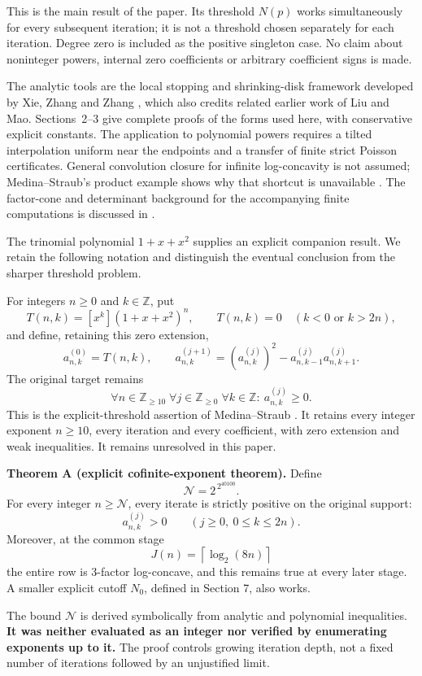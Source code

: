 \documentclass[11pt,a4paper]{article}
\begin{document}
This is the main result of the paper. Its threshold \(N(p)\) works simultaneously for every subsequent iteration; it is not a threshold chosen separately for each iteration. Degree zero is included as the positive singleton case. No claim about noninteger powers, internal zero coefficients or arbitrary coefficient signs is made.

The analytic tools are the local stopping and shrinking-disk framework developed by Xie, Zhang and Zhang \cite[Section~2]{XZZ}, which also credits related earlier work of Liu and Mao. Sections~2--3 give complete proofs of the forms used here, with conservative explicit constants. The application to polynomial powers requires a tilted interpolation uniform near the endpoints and a transfer of finite strict Poisson certificates. General convolution closure for infinite log-concavity is not assumed; Medina--Straub's product example shows why that shortcut is unavailable \cite[Example~5.1]{MS}. The factor-cone and determinant background for the accompanying finite computations is discussed in \cite{MCS}.

The trinomial polynomial \(1+x+x^2\) supplies an explicit companion result. We retain the following notation and distinguish the eventual conclusion from the sharper threshold problem.

For integers \(n\geq0\) and \(k\in\mathbb Z\), put \[
 T(n,k)=[x^k](1+x+x^2)^n,
 \qquad T(n,k)=0\quad(k<0\text{ or }k>2n),
\] and define, retaining this zero extension, \[
 a^{(0)}_{n,k}=T(n,k),\qquad
 a^{(j+1)}_{n,k}=(a^{(j)}_{n,k})^2-a^{(j)}_{n,k-1}a^{(j)}_{n,k+1}.
\] The original target remains \[
 \boxed{\forall n\in\mathbb Z_{\geq10}\;\forall j\in\mathbb Z_{\geq0}\;
        \forall k\in\mathbb Z:\ a^{(j)}_{n,k}\geq0.} \tag{T}
\]
This is the explicit-threshold assertion of Medina--Straub \cite[Example~5.3]{MS}. It retains every integer exponent \(n\geq10\), every iteration and every coefficient, with zero extension and weak inequalities. It remains unresolved in this paper.

\textbf{Theorem A (explicit cofinite-exponent theorem).} Define \[
 \mathcal N=2^{\,2^{40100}}.
\] For every integer \(n\geq\mathcal N\), every iterate is strictly
positive on the original support: \[
 a^{(j)}_{n,k}>0\qquad(j\geq0,\ 0\leq k\leq2n).
\] Moreover, at the common stage \[
 J(n)=\left\lceil\log_2(8n)\right\rceil
\] the entire row is 3-factor log-concave, and this remains true at
every later stage. A smaller explicit cutoff \(N_0\), defined in Section
7, also works.

The bound \(\mathcal N\) is derived symbolically from analytic and
polynomial inequalities. \textbf{It was neither evaluated as an integer
nor verified by enumerating exponents up to it.} The proof controls
growing iteration depth, not a fixed number of iterations followed by an
unjustified limit.
\end{document}

